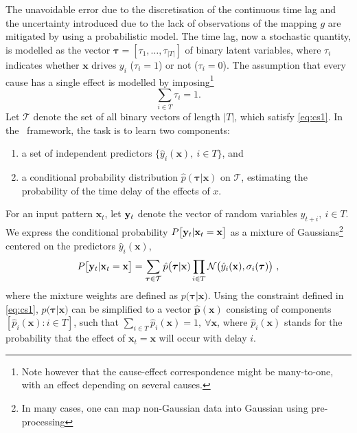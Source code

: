 The unavoidable error due to the discretisation of the continuous time lag and the uncertainty 
introduced due to the lack of observations of the mapping $g$ are mitigated by using a 
probabilistic model. The time lag, now a stochastic quantity, is modelled as the vector 
$\boldsymbol{\tau} = [\tau_1, \dots, \tau_{\rvert T \rvert}]$ of binary latent variables, 
where $\tau_i$ indicates whether $\mathbf{x}$ drives $y_i$ ($\tau_i=1$) or not ($\tau_i=0$). The 
assumption that every cause has a single effect is modelled by imposing\footnote{Note however 
that the cause-effect correspondence might be many-to-one, with an effect depending on several 
causes.}
%
\begin{equation}\label{eq:cs1}
\sum_{i \in T} \tau_i = 1.
\end{equation}
%
Let $\mathcal{T}$ denote the set of all binary vectors of length $\rvert T \rvert$, which satisfy 
\cref{eq:cs1}. In the \XX \ framework, the task is to learn two components: 
\begin{enumerate}
  \item a set of independent predictors $\{\hat y_i(\mathbf{x}),\ i \in T\}$, and
  \item a conditional probability distribution $\hat p(\boldsymbol{\tau} \rvert \mathbf{x})$ on 
        $\mathcal{T}$, estimating the probability of the time delay of the effects of $x$.
\end{enumerate} 
%
For an input pattern $\mathbf{x}_t$, let ${\bf y}_t$ denote the vector of random variables 
$y_{t+i},\ i \in T$. We express the conditional probability $P\bigl[{\bf y}_{t}\vert \mathbf{x}_t=\mathbf{x}\bigr]$ 
as a mixture of Gaussians\footnote{In many cases, one can map non-Gaussian data 
into Gaussian using pre-processing} centered on the predictors 
$\hat y_i(\mathbf{x})$, 
%
\begin{equation}\label{eq:py}
  P\bigl[{\bf y}_{t}\vert \mathbf{x}_t=\mathbf{x}\bigr] = 
  \sum_{\boldsymbol{\tau}\in \mathcal{T}} \hat p\bigl(\boldsymbol{\tau}\vert \mathbf{x}) 
  \prod_{i\in T} {\cal N}\bigl(\hat y_i(\mathbf{x}),\sigma_i(\boldsymbol{\tau})\bigr) \ ,
\end{equation}
%
where the mixture weights are defined as $p\bigl(\boldsymbol{\tau}\vert \mathbf{x})$. Using the constraint 
defined in \cref{eq:cs1}, $p\bigl(\boldsymbol{\tau}\vert \mathbf{x})$ can be simplified to a vector 
$\hat{\mathbf{p}}(\mathbf{x})$ consisting of components $[\hat p_i(\mathbf{x}): i \in T]$, such that 
$\sum_{i \in T}{\hat p_i(\mathbf{x})} = 1,\ \forall \mathbf{x}$, where $\hat p_i(\mathbf{x})$ stands for the probability that the effect of $\mathbf{x}_t=\mathbf{x}$ will occur with delay $i$.

